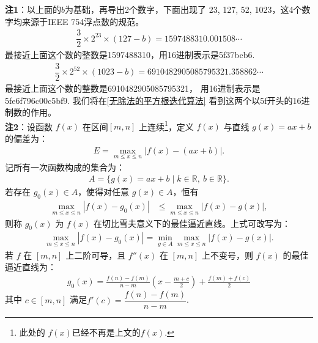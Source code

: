 \begin{enumerate}[label={【\textbf{例\thechapter.\arabic*}】},
 leftmargin=\inteval{\myenumleftmargin}pt,
 itemsep=\inteval{\myenumitempsep}pt,
 itemindent=\inteval{\myenumitemindent}pt]
\textbf{注1}：以上面的$ b $为基础，再导出2个数字，下面出现了
23, 127, 52, 1023，这4个数字均来源于IEEE 754浮点数的规范。
\begin{gather*}
    \dfrac{3}{2}\times 2^{23}\times(127-b)=
    1597488310.001508\cdots
\end{gather*} 
最接近上面这个数的整数是1597488310，用16进制表示是5f37bcb6.
\begin{gather*}                
    \dfrac{3}{2}\times 2^{52}\times(1023-b)=
    6910482905085795321.358862\cdots              
\end{gather*}
最接近上面这个数的整数是6910482905085795321，
用16进制表示是5fe6f796c00c5bf9. 
我们将在\ref{无除法的平方根迭代算法}
看到这两个以5f开头的16进制数的作用。\\
\textbf{注2}：设函数 $f(x)$ 在区间$[m,n]$ 上连续\footnote{此处的
$f(x)$已经不再是上文的$f(x)$. }，定义 $f(x)$ 与直线 $g(x)=ax+b$ 的偏差为：
\begin{gather*}
    E = \max_{m \leq x \leq n} |f(x) - (ax+b)|.
\end{gather*}
记所有一次函数构成的集合为：
\begin{gather*}
    A = \{ g(x) = ax+b \mid k \in \mathbb{R},\ b \in \mathbb{R} \}. 
\end{gather*}
若存在 $g_0(x) \in A$，使得对任意 $g(x) \in A$，恒有
\begin{align*}
    \max_{m \leq x \leq n} |f(x) - g_0(x)| &\leq \max_{m \leq x \leq n} |f(x) - g(x)|,
\end{align*}
则称 $g_0(x)$ 为 $f(x)$ 在切比雪夫意义下的最佳逼近直线。上式可改写为：
\begin{gather*}
    \max_{m \leq x \leq n} |f(x) - g_0(x)| = \min_{g \in A} \max_{m \leq x \leq n} |f(x) - g(x)|.
\end{gather*}
若 $f$ 在 $[m,n]$ 上二阶可导，且 $f''(x)$ 在 $[m,n]$ 上不变号，则 $f(x)$ 的最佳逼近直线为：
\begin{align}\label{切比雪夫最佳逼近直线方程}
    g_0(x) = \frac{f(n)-f(m)}{n-m} \left( x - \frac{m+c}{2} \right) + \frac{f(m)+f(c)}{2}
\end{align}
其中 $c \in [m,n]$ 满足$f'(c) = \dfrac{f(n)-f(m)}{n-m}$.


\end{enumerate}
